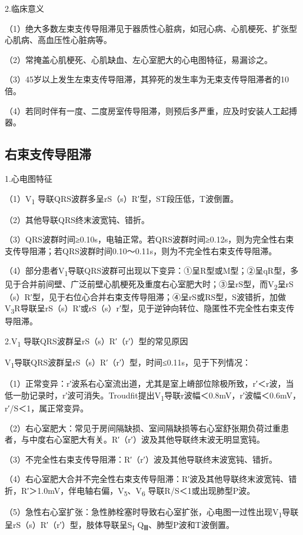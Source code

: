 2.临床意义

（1）绝大多数左束支传导阻滞见于器质性心脏病，如冠心病、心肌梗死、扩张型心肌病、高血压性心脏病等。

（2）常掩盖心肌梗死、心肌缺血、左心室肥大的心电图特征，易漏诊之。

（3）45岁以上发生左束支传导阻滞，其猝死的发生率为无束支传导阻滞者的10倍。

（4）若同时伴有一度、二度房室传导阻滞，则预后多严重，应及时安装人工起搏器。

\protect\hypertarget{text00009.htmlux5cux23subid56}{}{}

\subsection{右束支传导阻滞}

1.心电图特征

（1）V\textsubscript{1} 导联QRS波群多呈rS（s）R′型，ST段压低，T波倒置。

（2）其他导联QRS终末波宽钝、错折。

（3）QRS波群时间≥0.10s，电轴正常。若QRS波群时间≥0.12s，则为完全性右束支传导阻滞；若QRS波群时间0.10～0.11s，则为不完全性右束支传导阻滞。

（4）部分患者V\textsubscript{1}导联QRS波群可出现以下变异：①呈R型或M型；②呈qR型，多见于合并前间壁、广泛前壁心肌梗死及重度右心室肥大时；③呈rS型，而V\textsubscript{2}呈rS（s）R′型，见于右位心合并右束支传导阻滞；④呈rS或RS型，S波错折，加做V\textsubscript{3}R导联呈rS（s）R′或rS（s）r′型，见于逆钟向转位、隐匿性不完全性右束支传导阻滞。

2.V\textsubscript{1} 导联QRS波群呈rS（s）R′（r′）型的常见原因

V\textsubscript{1}导联QRS波群呈rS（s）R′（r′）型，时间≤0.11s，见于下列情况：

（1）正常变异：r′波系右心室流出道，尤其是室上嵴部位除极所致，r′＜r波，当低一肋记录时，r′波可消失。Troudfit提出V\textsubscript{1}导联r波幅＜0.8mV，r′波幅＜0.6mV，r′/S＜1，属正常变异。

（2）右心室肥大：常见于房间隔缺损、室间隔缺损等右心室舒张期负荷过重患者，与中度右心室肥大有关。R′（r′）波及其他导联终末波无明显宽钝。

（3）不完全性右束支传导阻滞：R′（r′）波及其他导联终末波宽钝、错折。

（4）右心室肥大合并不完全性右束支传导阻滞：R′波及其他导联终末波宽钝、错折，R′＞1.0mV，伴电轴右偏，V\textsubscript{5}、V\textsubscript{6} 导联R/S＜1或出现肺型P波。

（5）急性右心室扩张：急性肺栓塞时导致右心室扩张，心电图一过性出现V\textsubscript{1}导联呈rS（s）R′（r′）型，肢体导联呈S\textsubscript{I} Q\textsubscript{Ⅲ}、肺型P波和T波倒置。

